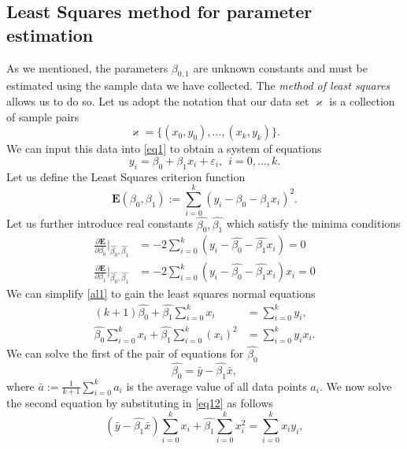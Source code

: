 \documentclass[10pt,a4paper, twocolumn, conference]{IEEEtran}
\begin{document}
\subsection{Least Squares method for parameter estimation}
As we mentioned, the parameters $\beta_{0,1}$ are unknown constants and must be estimated using the sample data we have collected. The \textit{method of least squares} allows us to do so. Let us adopt the notation that our data set $\varkappa$ is a collection of sample pairs
\begin{equation}
\varkappa = \{ (x_0, y_0), \ldots, (x_k, y_k) \}.
\end{equation}
We can input this data into \cref{eq1} to obtain a system of equations
\begin{equation}
y_i = \beta_0 + \beta_1 x_i + \varepsilon_i,~~i = 0, \ldots, k.
\end{equation}
Let us define the Least Squares criterion function
\begin{equation}
\mathbf{E}(\beta_0, \beta_1) := \sum_{i=0}^k (y_i - \beta_0 - \beta_1 x_i)^2.
\end{equation}
Let us further introduce real constants $\hat{\beta_0}, \hat{\beta_1}$ which satisfy the minima conditions
\begin{align} \label{al1} \nonumber
\frac{\partial \mathbf{E}}{\partial \beta_0} \Big|_{\hat{\beta_0}, \hat{\beta_1}} & = -2 \sum_{i=0}^k (y_i - \hat{\beta_0} - \hat{\beta_1}x_i) = 0 \\
\frac{\partial \mathbf{E}}{\partial \beta_1} \Big|_{\hat{\beta_0}, \hat{\beta_1}} & = -2 \sum_{i=0}^k (y_i - \hat{\beta_0} - \hat{\beta_1}x_i)x_i = 0
\end{align}
We can simplify \cref{al1} to gain the least squares normal equations
\begin{align}
\nonumber
(k + 1) \hat{\beta_0} + \hat{\beta_1} \sum_{i=0}^k x_i & = \sum_{i=0}^k y_i, \\
 \hat{\beta_0} \sum_{i=0}^k x_i + \hat{\beta_1} \sum_{i=0}^k (x_i)^2 & = \sum_{i=0}^k y_i x_i.
\end{align}
We can solve the first of the pair of equations for $\hat{\beta_0}$
\begin{equation} \label{eq12}
\hat{\beta_0} =\bar{y} - \hat{\beta_1} \bar{x},
\end{equation}
where $\bar{a} := \frac{1}{k+1} \sum_{i = 0}^k a_i$ is the average value of all data points $a_i$. We now solve the second equation by substituting in \cref{eq12} as follows
\begin{equation} \label{eq13}
(\bar{y} - \hat{\beta_1} \bar{x}) \sum_{i=0}^k x_i + \hat{\beta_1} \sum_{i=0}^k x_i^2 = \sum_{i=0}^k x_i y_i,
\end{equation}
\end{document}
